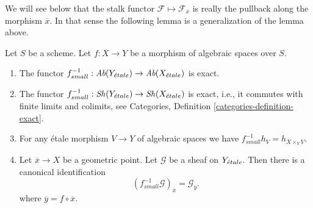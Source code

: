 \noindent
We will see below that the stalk functor
$\mathcal{F} \mapsto \mathcal{F}_{\overline{x}}$
is really the pullback along the morphism $\overline{x}$. In that sense
the following lemma is a generalization of the lemma above.

\begin{lemma}
\label{lemma-stalk-pullback}
Let $S$ be a scheme.
Let $f : X \to Y$ be a morphism of algebraic spaces over $S$.
\begin{enumerate}
\item The functor
$f_{small}^{-1} :
\textit{Ab}(Y_{\acute{e}tale})
\to
\textit{Ab}(X_{\acute{e}tale})$
is exact.
\item The functor
$f_{small}^{-1} :
\mathop{\mathit{Sh}}\nolimits(Y_{\acute{e}tale})
\to
\mathop{\mathit{Sh}}\nolimits(X_{\acute{e}tale})$
is exact, i.e., it commutes with finite limits and colimits, see
Categories, Definition \ref{categories-definition-exact}.
\item For any \'etale morphism $V \to Y$ of algebraic spaces
we have $f_{small}^{-1}h_V = h_{X \times_Y V}$.
\item Let $\overline{x} \to X$ be a geometric point.
Let $\mathcal{G}$ be a sheaf on $Y_{\acute{e}tale}$.
Then there is a canonical identification
$$
(f_{small}^{-1}\mathcal{G})_{\overline{x}} = \mathcal{G}_{\overline{y}}.
$$
where $\overline{y} = f \circ \overline{x}$.
\end{enumerate}
\end{lemma}

